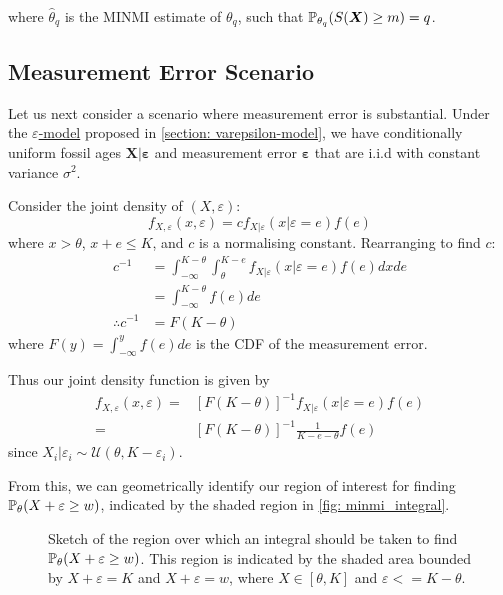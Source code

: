 where $\hat\theta_q$ is the MINMI estimate of $\theta_q$, such that $\mathbb{P}_{\theta_q} (S(\bm{X}) \geq m) = q$.

\subsection{Measurement Error Scenario}

Let us next consider a scenario where measurement error is substantial. Under the \hyperref[model: measurement-error]{$\varepsilon$-model} proposed in \autoref{section: varepsilon-model}, we have conditionally uniform fossil ages $\bm{X|\varepsilon}$ and measurement error $\bm{\varepsilon}$ that are i.i.d with constant variance $\sigma^2$.

Consider the joint density of $(X, \varepsilon)$:
\[
    f_{X, \varepsilon} ( x , \varepsilon) = c f_{X | \varepsilon} ( x | \varepsilon=e) f(e)
\] where $x > \theta$, $x+e \leq K$, and $c$ is a normalising constant. Rearranging to find $c$:
\begin{align*}
    c^{-1}
        &= \int_{-\infty}^{K-\theta} \int_{\theta}^{K-e} f_{X | \varepsilon} ( x | \varepsilon=e) f(e) dx de\\
        &= \int_{-\infty}^{K-\theta} f(e) de \\
    \therefore c^{-1} &= F(K - \theta)
\end{align*}
where $F(y)=\int_{-\infty}^{y} f(e) de$ is the CDF of the measurement error.

Thus our joint density function is given by
\begin{align*}
    f_{X, \varepsilon} ( x , \varepsilon)
        =& [F(K - \theta)]^{-1} f_{X | \varepsilon} ( x | \varepsilon=e) f(e) \\
        =& [F(K - \theta)]^{-1} \frac{1}{K - e - \theta} f(e)
\end{align*}
since $X_i | \varepsilon_i \sim \mathcal{U}(\theta, K-\varepsilon_i)$. 

From this, we can geometrically identify our region of interest for finding $\mathbb{P}_\theta ( X + \varepsilon \geq w)$, indicated by the shaded region in \autoref{fig: minmi_integral}.
\begin{figure}[ht]
    \centering
    
    \caption{Sketch of the region over which an integral should be taken to find $\mathbb{P}_\theta ( X + \varepsilon \geq w)$. This region is indicated by the shaded area bounded by  $X+\varepsilon = K$ and $X + \varepsilon = w$, where $X \in [\theta, K]$ and $\varepsilon <= K-\theta$.}
    \label{fig: minmi_integral}
\end{figure}

